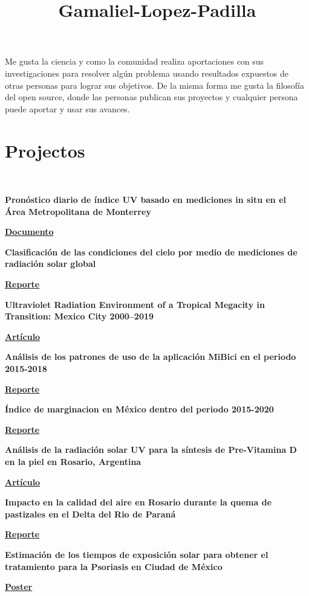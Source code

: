 \documentclass[a3paper]{adcv_color}
\title{Gamaliel-Lopez-Padilla}
\newcommand{\proyect}[5]{\begin{minipage}{1\linewidth}
		\begin{minipage}{1\linewidth}
			\textbf{#1}
		\end{minipage}
	\end{minipage}
	\href{#4}{\textbf{#5}}
	\vspace{0.05cm}\\
}
\begin{document}
\changefontsizes{16pt}

Me gusta la ciencia y como la comunidad realiza  aportaciones con sus investigaciones para resolver algún problema usando resultados expuestos de otras personas para lograr sus objetivos. De la misma forma me gusta la filosofía del open source, donde las personas publican sus proyectos y cualquier persona puede aportar y usar sus avances.

\section{Projectos}\\

\proyect{Pronóstico diario de índice UV basado en mediciones in situ en el Área Metropolitana de Monterrey}{Octubre 2023}{-0.8}{https://raw.githubusercontent.com/giovannilopez9808/Documents/master/Tesis/main.pdf}{Documento}

\proyect{Clasificación de las condiciones del cielo por medio de mediciones de radiación solar global}{Junio 2022}{-0.8}{https://github.com/giovannilopez9808/Cloud_classification/raw/main/Document/Main.pdf}{Reporte}

\proyect{Ultraviolet Radiation Environment of a Tropical Megacity in Transition: Mexico City 2000–2019}{Agosto 2021}{-0.6}{https://pubs.acs.org/doi/10.1021/acs.est.0c08515}{Artículo}

\proyect{Análisis de los patrones de uso de la aplicación MiBici en el periodo 2015-2018}{Noviembre 2021}{-0.2}{https://raw.githubusercontent.com/giovannilopez9808/MiBici/main/Document/Main.pdf}{Reporte}

\proyect{Índice de marginacion en México dentro del periodo 2015-2020}{Octubre 2021}{-0.2}{https://raw.githubusercontent.com/giovannilopez9808/IndiceDeMarginacion2015_2020/main/Document/Main.pdf}{Reporte}

\proyect{Análisis de la radiación solar UV para la síntesis de Pre-Vitamina D en la piel en Rosario, Argentina}{Enero 2022}{-0.8}{https://anales.fisica.org.ar/journal/index.php/analesafa/article/view/2318}{Artículo}

\proyect{Impacto en la calidad del aire en Rosario durante la quema de pastizales en el Delta del Rio de Paraná}{Agosto 2022}{-0.6}{https://rephip.unr.edu.ar/handle/2133/24201}{Reporte}

\proyect{Estimación de los tiempos de exposición solar para obtener el tratamiento para la Psoriasis en Ciudad de México}{Agosto 2020}{-0.2}{https://github.com/giovannilopez9808/Documents/raw/master/Posters/2020/CNF/TES/main.pdf}{Poster}
\end{document}
